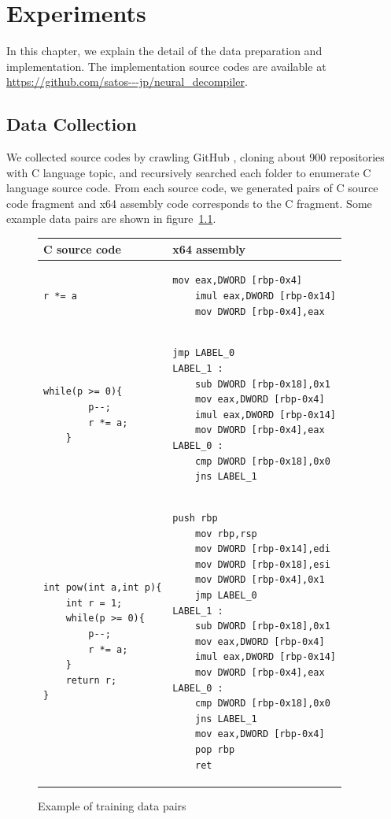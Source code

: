 \documentclass[senior,final,11pt]{iscs-thesis}
\begin{document}
\chapter{Experiments}
In this chapter, we explain the detail of the data preparation and implementation.
The implementation source codes are available at \url{https://github.com/satos---jp/neural_decompiler}.  

\section{Data Collection}
We collected source codes by crawling GitHub \citep{github}, cloning about 900 repositories with C language topic, 
and recursively searched each folder to enumerate C language source code.
From each source code, we generated pairs of C source code fragment and x64 assembly code corresponds to the C fragment.
Some example data pairs are shown in figure~\ref{fig:pairsoffragments}. 

\begin{figure}
	\begin{tabular}{|l|l|} \hline
	 C source code & x64 assembly \\ \hline 
		\begin{lstlisting}[style=Csample]
		r *= a
		\end{lstlisting}
		&
		\begin{lstlisting}[style=Asmsample]
	mov eax,DWORD [rbp-0x4]
	imul eax,DWORD [rbp-0x14]
	mov DWORD [rbp-0x4],eax
		\end{lstlisting} \\ \hline	
		\begin{lstlisting}[style=Csample]
	while(p >= 0){
		p--;
		r *= a;
	}
		\end{lstlisting}
		&
		\begin{lstlisting}[style=Asmsample]
	jmp LABEL_0
LABEL_1 :
	sub DWORD [rbp-0x18],0x1
	mov eax,DWORD [rbp-0x4]
	imul eax,DWORD [rbp-0x14]
	mov DWORD [rbp-0x4],eax
LABEL_0 :
	cmp DWORD [rbp-0x18],0x0
	jns LABEL_1
		\end{lstlisting} \\ \hline		
		\begin{lstlisting}[style=Csample]
int pow(int a,int p){
	int r = 1;
	while(p >= 0){
		p--;
		r *= a;
	}
	return r;
}
		\end{lstlisting}
		&
		\begin{lstlisting}[style=Asmsample]
	push rbp
	mov rbp,rsp
	mov DWORD [rbp-0x14],edi
	mov DWORD [rbp-0x18],esi
	mov DWORD [rbp-0x4],0x1
	jmp LABEL_0
LABEL_1 :
	sub DWORD [rbp-0x18],0x1
	mov eax,DWORD [rbp-0x4]
	imul eax,DWORD [rbp-0x14]
	mov DWORD [rbp-0x4],eax
LABEL_0 :
	cmp DWORD [rbp-0x18],0x0
	jns LABEL_1
	mov eax,DWORD [rbp-0x4]
	pop rbp
	ret
		\end{lstlisting} \\ \hline
	\end{tabular}
	\caption{Example of training data pairs}
	\label{fig:pairsoffragments}
\end{figure}
\end{document}
